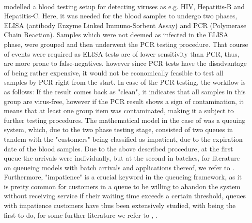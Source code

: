 \documentclass[11pt,a4paper]{article}
\begin{document}
\begin{spacing}{1.8}
\\
 \citet{BarLev2011} modelled a blood testing setup for detecting viruses as e.g. HIV, Hepatitis-B and Hepatitis-C. Here, it was needed for the blood samples to undergo two  phases, ELISA (antibody Enzyme Linked Immuno-Sorbent Assay) and PCR (Polymerase Chain Reaction). Samples which were not deemed as infected in the ELISA phase, were grouped and then underwent the PCR testing procedure. That course of events were required as ELISA tests are of lower sensitivity than PCR, thus, are more prone to false-negatives, however since PCR tests have the disadvantage of being rather expensive, it would not be economically feasible to test all samples by PCR right from the start. In case of the PCR testing, the workflow is as follows: If the result comes back as "clean", it indicates that all samples in this group are virus-free, however if the PCR result shows a sign of contamination, it means that at least one group item was contaminated, making it a subject to further testing procedures. The mathematical model in the case of \citep{BarLev2011} was a queuing system, which, due to the two phase testing stage, consisted of two queues in tandem with the "customers" being classified as impatient, due to the expiration date of the blood samples. Due to the above described procedure, at the first queue the arrivals were individually, but at the second in batches, for literature on queueing models with batch arrivals and applications thereof, we refer to \citep{Chaudhry1983} \citep{Reddy1998} \citep{Bansal2003} \citep{Tadj2003} \citep{CHANG2005} \citep{Reddy1998} \citep{BarLev2007} \citep{Zisgen2022}. Furthermore, "impatience" is a crucial keyword in the queueing framework, as it is pretty common for customers in a queue to be willing to abandon the system without receiving service if their waiting time exceeds a certain threshold, queues with impatience customers have thus been extensively studied, with \citep{Barrer1957} being the first to do,  for some further literature we refer to  \citep{Kok1985}, \citep{Boots1999} \citep{Wang2010}. \medskip

\end{spacing}
\end{document}
